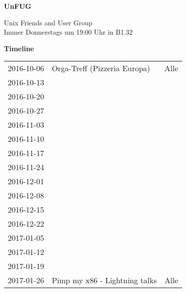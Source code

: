 \documentclass[
    headinclude=false,
    footinclude=false,
    paper=A3,
    paper=portrait,
    pagesize
]{scrartcl}
\newcommand{\talk}[3]{#1 & #3 & #2 \\}
\begin{document}
    \thispagestyle{empty}

    \begin{mdframed}[style=mdunfuggreen]
        \begin{center}
            \vspace{0.7cm}

            {\fontsize{80}{96} \selectfont \textbf{UnFUG}}

            \begin{Huge}
                \vspace{0.7cm}
                Unix Friends and User Group
                \vspace{0.7cm} \\
                Immer Donnerstags um 19:00 Uhr in B1.32
                \vspace{0.7cm}
            \end{Huge}

        \end{center}
    \end{mdframed}

    \begin{mdframed}[style=mdunfugblank]
        \begin{center}
            {\fontsize{40}{40} \selectfont \textbf{Timeline}}

            \vspace{1cm}

            \begin{Huge}
                \begin{tabular}{l | p{16cm} | p{5cm}}
                    \rowcolor{gray!25}
                    \talk{2016-10-06}{Alle}{Orga-Treff (Pizzeria Europa)}
                    \talk{2016-10-13}{}{}
                    \talk{2016-10-20}{}{}
                    \talk{2016-10-27}{}{}
                    \talk{2016-11-03}{}{}
                    \talk{2016-11-10}{}{}
                    \talk{2016-11-17}{}{}
                    \talk{2016-11-24}{}{}
                    \talk{2016-12-01}{}{}
                    \talk{2016-12-08}{}{}
                    \talk{2016-12-15}{}{}

                    \talk{2016-12-22}{}{}
                    \talk{2017-01-05}{}{}

                    \talk{2017-01-12}{}{}
                    \talk{2017-01-19}{}{}
                    \talk{2017-01-26}{Alle}{Pimp my x86 - Lightning talks}

                \end{tabular}
            \end{Huge}
        \end{center}
    \end{mdframed}
\end{document}

